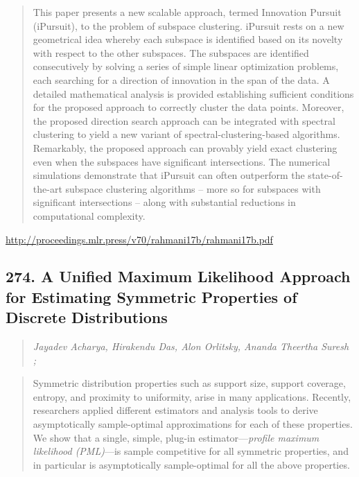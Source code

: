 \documentclass{article}
\begin{document}
\begin{quote}
    This paper presents a new scalable approach, termed Innovation Pursuit (iPursuit), to the problem of subspace clustering. iPursuit rests on a new geometrical idea whereby each subspace is identified based on its novelty with respect to the other subspaces. The subspaces are identified consecutively by solving a series of simple linear optimization problems, each searching for a direction of innovation in the span of the data. A detailed mathematical analysis is provided establishing sufficient conditions for the proposed approach to correctly cluster the data points. Moreover, the proposed direction search approach can be integrated with spectral clustering to yield a new variant of spectral-clustering-based algorithms. Remarkably, the proposed approach can provably yield exact clustering even when the subspaces have significant intersections. The numerical simulations demonstrate that iPursuit can often outperform the state-of-the-art subspace clustering algorithms – more so for subspaces with significant intersections – along with substantial reductions in computational complexity.  
\end{quote}

\href{http://proceedings.mlr.press/v70/rahmani17b/rahmani17b.pdf}{http://proceedings.mlr.press/v70/rahmani17b/rahmani17b.pdf}

\subsection{274. A Unified Maximum Likelihood Approach for Estimating Symmetric Properties of Discrete Distributions}

\begin{quote}
\footnotesize{\textit{Jayadev Acharya, Hirakendu Das, Alon Orlitsky, Ananda Theertha Suresh ;}}

\end{quote}

\begin{quote}
    Symmetric distribution properties such as support size, support coverage, entropy, and proximity to uniformity, arise in many applications. Recently, researchers applied different estimators and analysis tools to derive asymptotically sample-optimal approximations for each of these properties. We show that a single, simple, plug-in estimator—\textit{profile maximum likelihood (PML)}—is sample competitive for all symmetric properties, and in particular is asymptotically sample-optimal for all the above properties.  
\end{quote}
\end{document}
